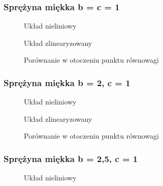 \documentclass[a4paper, 10pt]{article}
\begin{document}
			\subsubsection{Sprężyna miękka b = c = 1}
				\begin{figure}[H]
					\centering
					\def \svgwidth{0.8\columnwidth}
					
					\caption{Układ nieliniowy}
				\end{figure}\noindent
				
				
				\begin{figure}[H]
					\centering
					\def \svgwidth{0.8\columnwidth}
					
					\caption{Układ zlinearyzowany}
				\end{figure}\noindent
				
				
				\begin{figure}[H]
					\centering
					\def \svgwidth{0.8\columnwidth}
					
					\caption{Porównanie w otoczeniu punktu równowagi}
				\end{figure}\noindent
				
			\subsubsection{Sprężyna miękka b = 2, c = 1}
				\begin{figure}[H]
					\centering
					\def \svgwidth{0.8\columnwidth}
					
					\caption{Układ nieliniowy}
				\end{figure}\noindent
				
				
				\begin{figure}[H]
					\centering
					\def \svgwidth{0.8\columnwidth}
					
					\caption{Układ zlinearyzowany}
				\end{figure}\noindent
				
				
				\begin{figure}[H]
					\centering
					\def \svgwidth{0.8\columnwidth}
					
					\caption{Porównanie w otoczeniu punktu równowagi}
				\end{figure}\noindent
				
			\subsubsection{Sprężyna miękka b = 2,5, c = 1}
				\begin{figure}[H]
					\centering
					\def \svgwidth{0.8\columnwidth}
					
					\caption{Układ nieliniowy}
				\end{figure}\noindent
				
\end{document}

